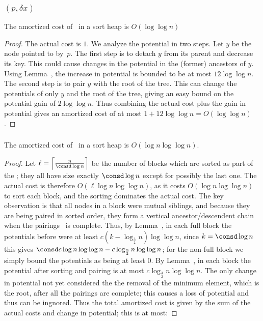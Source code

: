 \begin{fullonly}
\subsubsection{\opDc$(p,\delta x)$}

\begin{lemma}
The amortized cost of \opDc\ in a sort heap is $O(\log \log n)$ \checked
\end{lemma}

\begin{proof}
The actual cost is $1$. We analyze the potential in two steps. Let $y$ be the node pointed to by~$p$. The first step is to detach $y$ from its parent and decrease its key. 
This could cause changes in the potential in the (former) ancestors of $y$. Using Lemma~, the increase in potential is bounded to be at most $12 \log \log n$. The second step is to pair $y$ with the root of the tree. This can change the potentials of only $y$ and the root of the tree, giving an easy bound on the potential gain of $2 \log \log n$. Thus combining the actual cost plus the gain in potential gives an amortized cost of at most $1+ 12 \log \log n = O(\log \log n)$.
\end{proof}

\subsubsection{\opEm} 

\begin{lemma}
The amortized cost of \opEm\ in a sort heap is $O(\log n \log \log n)$. 
\end{lemma}

\begin{proof} Let $\ell=\left\lceil \frac{n}{\consd \log n} \right\rceil$ be the number of blocks which are sorted as part of the \opEm ; they all have size exactly $\consd \log n$ except for possibly the last one.
The actual cost is therefore $O(\ell \log n \log \log n)$, as it costs $O(  \log n \log \log n)$ to sort each block, and the sorting dominates the actual cost.
The key observation is that all nodes in a block were mutual siblings, and because they are being paired in sorted order, they form a vertical ancestor/descendent chain when the pairings \opEm\ is complete.
Thus, by Lemma~, in each full block the potentials before were at least 
$c(k-\log_\frac32 n)\log \log n$, since $k=\consd \log n$ this gives $\consd c  \log n \log \log n - c\log_\frac32 n \log \log n$; for the non-full block we simply bound the potentials as being at least 0. By Lemma~, in each block the potential after sorting and pairing is at most $c\log_\frac32 n \log \log n$. The only change in potential not yet considered the the removal of the minimum element, which is the root, after all the pairings are complete; this causes a loss of potential and thus can be ingnored. Thus the total amortized cost is given by the sum of the actual costs and change in potential; this is at most:


\end{proof}
\end{fullonly}
